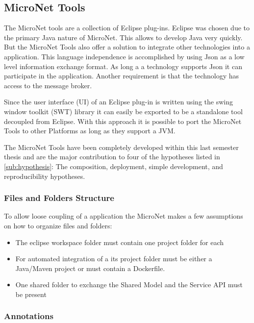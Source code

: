 \subsection{MicroNet Tools}

The MicroNet tools are a collection of Eclipse plug-ins. Eclipse was chosen due
to the primary Java nature of MicroNet. This allows to develop Java \mss{} very
quickly. But the MicroNet Tools also offer a solution to integrate other
technologies into a \ms{} application. This language independence is
accomplished by using Json as a low level information exchange format. As long a
a technology supports Json it can participate in the application. Another
requirement is that the technology has access to the message broker.

Since the user interface (UI) of an Eclipse plug-in is written using the swing
window toolkit (SWT) library it can easily be exported to be a standalone tool
decoupled from Eclipse. With this approach it is possible to port the MicroNet
Tools to other Platforms as long as they support a JVM.

The MicroNet Tools have been completely developed within this last semester
thesis and are the major contribution to four of the hypotheses listed in
\autoref{sub:hypothesis}: The composition, deployment, simple development, and 
reproducibility hypotheses.

\subsubsection{Files and Folders Structure}

To allow loose coupling of a \ms{} application the MicroNet makes a few
assumptions on how to organize files and folders:

\begin{itemize}
  \item The eclipse workspace folder must contain one project folder for each
  \ms{}
  \item For automated integration of a \ms{} its project folder must be either a
  Java/Maven project or must contain a Dockerfile.
 \item One shared folder to exchange the Shared Model and the Service API must
 be present
\end{itemize}  

\subsubsection{Annotations}

